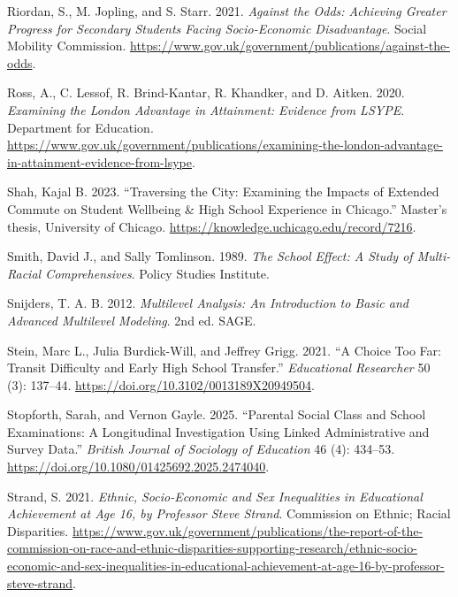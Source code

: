 \documentclass[
  12pt,
  titlepage]{article}
\newlength{\cslhangindent}
\newenvironment{CSLReferences}[2] %
 {\begin{list}{}{%
  \setlength{\itemindent}{0pt}
  \setlength{\leftmargin}{0pt}
  \setlength{\parsep}{0pt}
  \ifodd #1
   \setlength{\leftmargin}{\cslhangindent}
   \setlength{\itemindent}{-1\cslhangindent}
  \fi
  \setlength{\itemsep}{#2\baselineskip}}}
 {\end{list}}
\begin{document}
\begin{CSLReferences}{1}{1}
Riordan, S., M. Jopling, and S. Starr. 2021. \emph{Against the Odds:
Achieving Greater Progress for Secondary Students Facing Socio-Economic
Disadvantage}. Social Mobility Commission.
\url{https://www.gov.uk/government/publications/against-the-odds}.

Ross, A., C. Lessof, R. Brind-Kantar, R. Khandker, and D. Aitken. 2020.
\emph{Examining the {London} Advantage in Attainment: Evidence from
{LSYPE}}. Department for Education.
\url{https://www.gov.uk/government/publications/examining-the-london-advantage-in-attainment-evidence-from-lsype}.

Shah, Kajal B. 2023. {``Traversing the {City}: {Examining} the {Impacts}
of {Extended} {Commute} on {Student} {Wellbeing} \& {High} {School}
{Experience} in {Chicago}.''} Master's thesis, University of Chicago.
\url{https://knowledge.uchicago.edu/record/7216}.

Smith, David J., and Sally Tomlinson. 1989. \emph{The {School} {Effect}:
{A} {Study} of {Multi}-{Racial} {Comprehensives}}. Policy Studies
Institute.

Snijders, T. A. B. 2012. \emph{Multilevel Analysis: An Introduction to
Basic and Advanced Multilevel Modeling}. 2nd ed. SAGE.

Stein, Marc L., Julia Burdick-Will, and Jeffrey Grigg. 2021. {``A Choice
Too Far: Transit Difficulty and Early High School Transfer.''}
\emph{Educational Researcher} 50 (3): 137--44.
\url{https://doi.org/10.3102/0013189X20949504}.

Stopforth, Sarah, and Vernon Gayle. 2025. {``Parental Social Class and
School Examinations: A Longitudinal Investigation Using Linked
Administrative and Survey Data.''} \emph{British Journal of Sociology of
Education} 46 (4): 434--53.
\url{https://doi.org/10.1080/01425692.2025.2474040}.

Strand, S. 2021. \emph{Ethnic, Socio-Economic and Sex Inequalities in
Educational Achievement at Age 16, by {Professor} {Steve} {Strand}}.
Commission on Ethnic; Racial Disparities.
\url{https://www.gov.uk/government/publications/the-report-of-the-commission-on-race-and-ethnic-disparities-supporting-research/ethnic-socio-economic-and-sex-inequalities-in-educational-achievement-at-age-16-by-professor-steve-strand}.


\end{CSLReferences}
\end{document}
